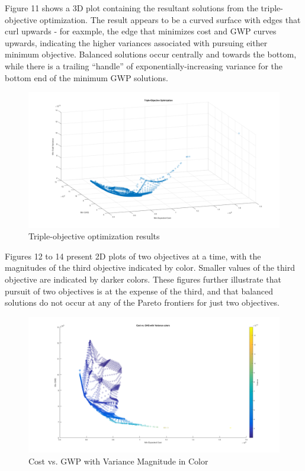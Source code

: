 \documentclass{article}
\begin{document}
		Figure 11 shows a 3D plot containing the resultant solutions from the triple-objective optimization. The result appears to be a curved surface with edges that curl upwards - for eaxmple, the edge that minimizes cost and GWP curves upwards, indicating the higher variances associated with pursuing either minimum objective. Balanced solutions occur centrally and towards the bottom, while there is a trailing ``handle'' of exponentially-increasing variance for the bottom end of the minimum GWP solutions.
		
		\begin{figure}
			\includegraphics[width=\textwidth]{435_12_tripleobj}
			\caption{Triple-objective optimization results}
		\end{figure}
	
		Figures 12 to 14 present 2D plots of two objectives at a time, with the magnitudes of the third objective indicated by color. Smaller values of the third objective are indicated by darker colors. These figures further illustrate that pursuit of two objectives is at the expense of the third, and that balanced solutions do not occur at any of the Pareto frontiers for just two objectives.
		
		\begin{figure}
			\includegraphics[width=\textwidth]{435_13_costghg}
			\caption{Cost vs. GWP with Variance Magnitude in Color}
		\end{figure}
		
\end{document}
